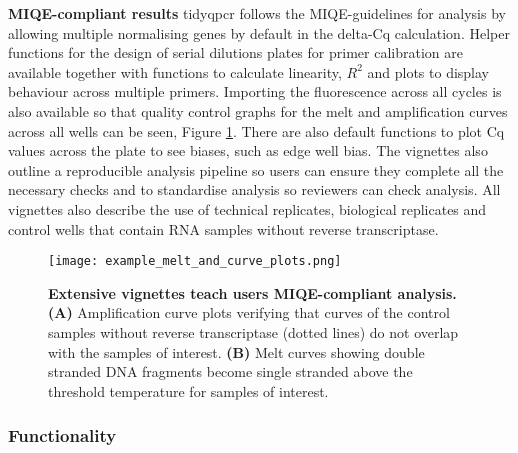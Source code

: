 \documentclass[../main.tex]{subfiles}
\begin{document}
\textbf{MIQE-compliant results} tidyqpcr follows the MIQE-guidelines for analysis by allowing multiple normalising genes by default in the delta-Cq calculation. 
Helper functions for the design of serial dilutions plates for primer calibration are available together with functions to calculate linearity, $R^2$ and plots to display behaviour across multiple primers.
Importing the fluorescence across all cycles is also available so that quality control graphs for the melt and amplification curves across all wells can be seen, Figure \ref{fig:plate-amp-curves}.
There are also default functions to plot Cq values across the plate to see biases, such as edge well bias. 
The vignettes also outline a reproducible analysis pipeline so users can ensure they complete all the necessary checks and to standardise analysis so reviewers can check analysis.
All vignettes also describe the use of technical replicates, biological replicates and control wells that contain RNA samples without reverse transcriptase.

\begin{figure}[t]

{\centering \texttt{[image: example\_melt\_and\_curve\_plots.png]} 

}

\caption[Extensive vignettes teach users MIQE-compliant analysis.]{\textbf{Extensive vignettes teach users MIQE-compliant analysis.} \textbf{(A)} Amplification curve plots verifying that curves of the control samples without reverse transcriptase (dotted lines) do not overlap with the samples of interest.
\textbf{(B)} Melt curves showing double stranded DNA fragments become single stranded above the threshold temperature for samples of interest.} \label{fig:plate-amp-curves}
\end{figure}

\subsubsection{Functionality}
\end{document}
